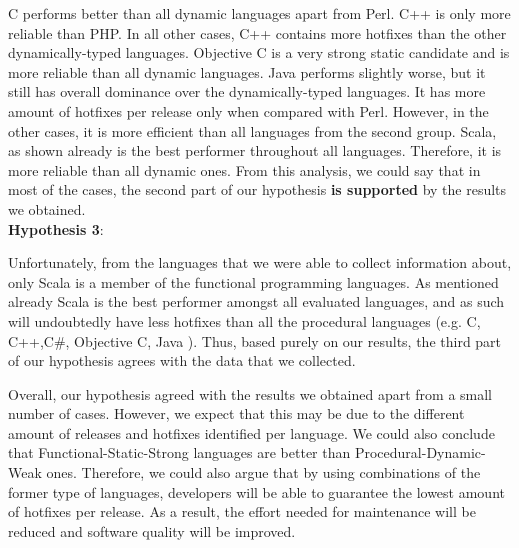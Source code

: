 C performs better than all dynamic languages apart from Perl. 
C++ is only more reliable than PHP. In all other cases, C++ contains more hotfixes than the other dynamically-typed languages. 
Objective C is a very strong static candidate and is more reliable than all dynamic languages. Java performs slightly worse, but it still has overall dominance over the dynamically-typed languages. It has more amount of hotfixes per release only when compared with Perl. However, in the other cases, it is more efficient than all languages from the second group. Scala, as shown already is the best performer throughout all languages. Therefore, it is more reliable than all dynamic ones. From this analysis, we could say that in most of the cases, the second part of our hypothesis \textbf{is supported} by the results we obtained.\\

\textbf{Hypothesis 3}:\par
Unfortunately, from the languages that we were able to collect information about, only Scala is a member of the functional programming languages. As mentioned already Scala is the best performer amongst all evaluated languages, and as such will undoubtedly have less hotfixes than all the procedural languages (e.g. C, C++,C\#, Objective C, Java ). Thus, based purely on our results, the third part of our hypothesis agrees with the data that we collected.\par

Overall, our hypothesis agreed with the results we obtained apart from a small number of cases. However, we expect that this may be due to the different amount of releases and hotfixes identified per language. We could also conclude that Functional-Static-Strong languages are better than Procedural-Dynamic-Weak ones. Therefore, we could also argue that by using combinations of the former type of languages, developers will be able to guarantee the lowest amount of hotfixes per release. As a result, the effort needed for maintenance will be reduced and software quality will be improved.


